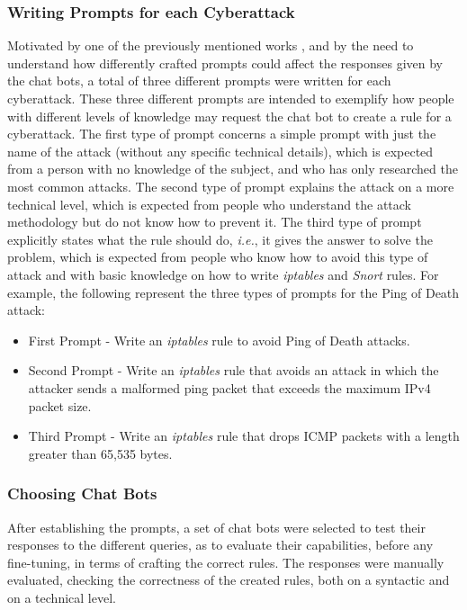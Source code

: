 \documentclass[sigconf]{acmart}
\begin{document}
\subsubsection{Writing Prompts for each Cyberattack}
Motivated by one of the previously mentioned works \cite{Temara23}, and by the need to understand how differently crafted prompts could affect the responses given by the chat bots, a total of three different prompts were written for each cyberattack. These three different prompts are intended to exemplify how people with different levels of knowledge may request the chat bot to create a rule for a cyberattack. The first type of prompt concerns a simple prompt with just the name of the attack (without any specific technical details), which is expected from a person with no knowledge of the subject, and who has only researched the most common attacks. The second type of prompt explains the attack on a more technical level, which is expected from people who understand the attack methodology but do not know how to prevent it. The third type of prompt explicitly states what the rule should do, \textit{i.e.}, it gives the answer to solve the problem, which is expected from people who know how to avoid this type of attack and with basic knowledge on how to write \textit{iptables} and \textit{Snort} rules. For example, the following represent the three types of prompts for the Ping of Death attack:
\begin{itemize}
    \item First Prompt - Write an \textit{iptables} rule to avoid Ping of Death attacks.
    \item Second Prompt - Write an \textit{iptables} rule that avoids an attack in which the attacker sends a malformed ping packet that exceeds the maximum IPv4 packet size.
    \item Third Prompt - Write an \textit{iptables} rule that drops ICMP packets with a length greater than 65,535 bytes.
\end{itemize}

\subsubsection{Choosing Chat Bots}
After establishing the prompts, a set of chat bots were selected to test their responses to the different queries, as to evaluate their capabilities, before any fine-tuning, in terms of crafting the correct rules. The responses were manually evaluated, checking the correctness of the created rules, both on a syntactic and on a technical level. 
\end{document}
